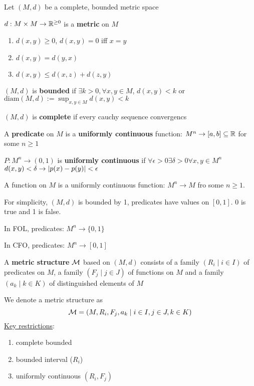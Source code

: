 \documentclass[11pt]{article}
\def \diam {\text{diam}}
\begin{document}
Let \((M,d)\) be a complete, bounded metric space

\(d:M\times M\to\mathbb{R}^{\ge0}\) is a \textbf{metric} on \(M\)
\begin{enumerate}
\item \(d(x,y)\ge0\), \(d(x,y)=0\) iff \(x=y\)
\item \(d(x,y)=d(y,x)\)
\item \(d(x,y)\le d(x,z)+d(z,y)\)
\end{enumerate}


\((M,d)\) is \textbf{bounded} if \(\exists k>0,\forall x,y\in M\), \(d(x,y)<k\) or
\(\diam(M,d):=\sup_{x,y\in M}d(x,y)<k\)

\((M,d)\) is \textbf{complete} if every cauchy sequence convergencs




A \textbf{predicate} on \(M\) is a \textbf{uniformly continuous} function:
\(M^n\to[a,b]\subseteq\mathbb{R}\) for some \(n\ge1\)

\(P:M^n\to(0,1)\) is \textbf{uniformly continuous} if \(\forall \epsilon>0\exists\delta>0\forall x,y\in M^n\)
\(d(x,y)<\delta\to\abs{p(x)-p(y)}<\epsilon\)

A function on \(M\) is a uniformly continuous function: \(M^n\to M\) fro some \(n\ge1\).

For simplicity, \((M,d)\) is bounded by 1, predicates have values on \([0,1]\). 0 is true and 1 is
false.

\begin{remark}
In FOL, predicates: \(M^n\to\{0,1\}\)

In CFO, predicates: \(M^n\to[0,1]\)
\end{remark}

A \textbf{metric structure} \(\mathcal{M}\) based on \((M,d)\) consists of a family \((R_i\mid i\in I)\) of
predicates on \(M\), a family \((F_j\mid j\in J)\) of functions on \(M\) and a
family \((a_k\mid k\in K)\) of distinguished elements of \(M\)

We denote a metric structure as
\begin{equation*}
  \mathcal{M}=(M,R_i,F_j,a_k\mid i\in I,j\in J,k\in K)
\end{equation*}
\uline{Key restrictions}:
\begin{enumerate}
\item complete bounded
\item bounded interval (\(R_i\))
\item uniformly continuous \((R_i,F_j)\)
\end{enumerate}
\end{document}
